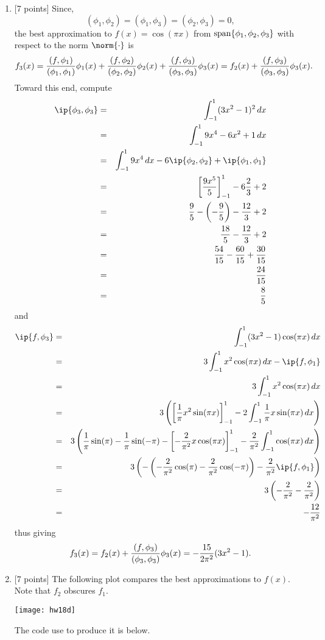 \begin{solution}
\begin{enumerate}
\item {[7 points]}
Since,
 \[ (\phi_1,\phi_2) = (\phi_1,\phi_3) = (\phi_2,\phi_3) = 0,\]
the best approximation to $f(x) = \cos(\pi x)$ from ${\rm span}\{\phi_1,\phi_2,\phi_3\}$ with respect to the norm $\norm{\cdot}$ is
       \[ f_3(x) = {(f,\phi_1) \over (\phi_1, \phi_1)} \phi_1(x) + {(f,\phi_2) \over (\phi_2, \phi_2)} \phi_2(x) + {(f,\phi_3) \over (\phi_3, \phi_3)} \phi_3(x) = f_2(x) + {(f,\phi_3) \over (\phi_3, \phi_3)} \phi_3(x).\]
Toward this end, compute
\begin{eqnarray*}
  \ip{\phi_3,\phi_3} &=& \int_{-1}^1 (3x^2-1)^2\,dx
\\
 &=& \int_{-1}^1 9x^4-6x^2+1\,dx
\\
 &=& \int_{-1}^1 9x^4\,dx-6\ip{\phi_2,\phi_2} +\ip{\phi_1,\phi_1}
\\
 &=& \left[{9x^5\over 5}\right]_{-1}^1-6{2\over 3} +2
\\
 &=& {9\over 5}-\left(-{9\over 5}\right)-{12\over 3} +2
\\
 &=& {18\over 5}-{12\over 3} +2
\\
 &=& {54\over 15}-{60\over 15} +{30\over 15}
\\
 &=& {24\over 15}
\\
 &=& {8\over 5}
\end{eqnarray*}
and
\begin{eqnarray*}
  \ip{f,\phi_3} &=& \int_{-1}^1 (3x^2-1)\cos(\pi x)\,dx
\\
 &=& 3\int_{-1}^1 x^2\cos(\pi x)\,dx-\ip{f,\phi_1}
\\
 &=& 3\int_{-1}^1 x^2\cos(\pi x)\,dx
\\
 &=& 3\left(\left[\frac{1}{\pi}x^2\sin(\pi x)\right]_{-1}^1-2\int_{-1}^1 \frac{1}{\pi}x\sin(\pi x)\,dx\right)
\\
 &=& 3\left(\frac{1}{\pi}\sin(\pi)-\frac{1}{\pi}\sin(-\pi)-\left[-\frac{2}{\pi^2}x\cos(\pi x)\right]_{-1}^1-\frac{2}{\pi^2}\int_{-1}^1 \cos(\pi x)\,dx\right)
\\
 &=& 3\left(-\left(-\frac{2}{\pi^2}\cos(\pi )-\frac{2}{\pi^2}\cos(-\pi)\right)-\frac{2}{\pi^2}\ip{f,\phi_1}\right)
\\
 &=& 3\left(-\frac{2}{\pi^2}-\frac{2}{\pi^2}\right)
\\
 &=& -\frac{12}{\pi^2}
\end{eqnarray*}
thus giving
       \[ f_3(x) = f_2(x) + {(f,\phi_3) \over (\phi_3, \phi_3)} \phi_3(x) = -\frac{15}{2\pi^2} (3x^2-1) .\]

\item {[7 points]} The following plot compares the best approximations to $f(x)$. Note that $f_2$ obscures $f_1$.

\begin{center} \texttt{[image: hw18d]} \end{center}

The code use to produce it is below.


\end{enumerate}

\end{solution}

